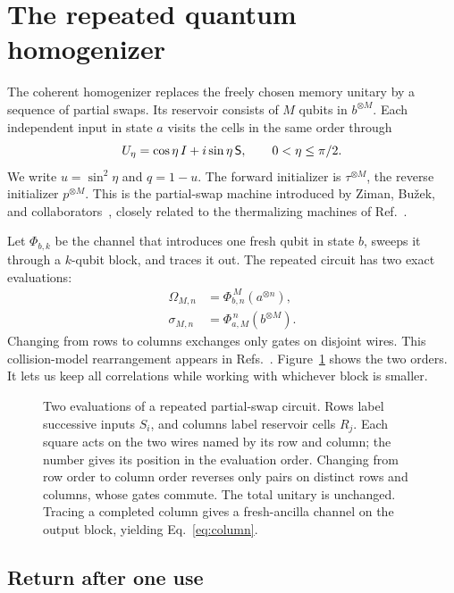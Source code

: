 \documentclass[aps,pra,reprint,superscriptaddress,longbibliography,nofootinbib,floatfix]{revtex4-2}
\begin{document}
\section{The repeated quantum homogenizer}\label{sec:homogenizer}

The coherent homogenizer replaces the freely chosen memory unitary by a sequence of partial swaps. Its reservoir consists of $M$ qubits in $b^{\otimes M}$. Each independent input in state $a$ visits the cells in the same order through
\begin{equation}
 U_\eta=\cos\eta\,I+i\sin\eta\,\mathsf S,
 \qquad 0<\eta\le\pi/2.
 \label{eq:partialswap}
\end{equation}
We write $u=\sin^2\eta$ and $q=1-u$. The forward initializer is $\tau^{\otimes M}$, the reverse initializer $p^{\otimes M}$. This is the partial-swap machine introduced by Ziman, Bu\v{z}ek, and collaborators~\cite{ziman}, closely related to the thermalizing machines of Ref.~\cite{scarani}.

Let $\Phi_{b,k}$ be the channel that introduces one fresh qubit in state $b$, sweeps it through a $k$-qubit block, and traces it out. The repeated circuit has two exact evaluations:
\begin{align}
 \Omega_{M,n}&=\Phi_{b,n}^{\,M}(a^{\otimes n}),\nonumber\\
 \sigma_{M,n}&=\Phi_{a,M}^{\,n}(b^{\otimes M}).
 \label{eq:column}
\end{align}
Changing from rows to columns exchanges only gates on disjoint wires. This collision-model rearrangement appears in Refs.~\cite{gp,cascade}. Figure~\ref{fig:grid} shows the two orders. It lets us keep all correlations while working with whichever block is smaller.

\begin{figure}[!t]
\centering

\caption{Two evaluations of a repeated partial-swap circuit. Rows label successive inputs $S_i$, and columns label reservoir cells $R_j$. Each square acts on the two wires named by its row and column; the number gives its position in the evaluation order. Changing from row order to column order reverses only pairs on distinct rows and columns, whose gates commute. The total unitary is unchanged. Tracing a completed column gives a fresh-ancilla channel on the output block, yielding Eq.~\eqref{eq:column}.}
\label{fig:grid}
\end{figure}

\subsection{Return after one use}
\end{document}
